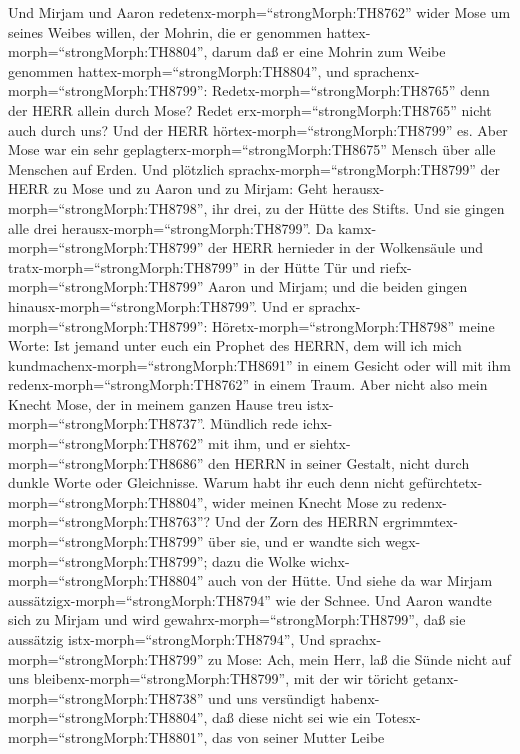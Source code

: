  Und Mirjam und Aaron redetenx-morph=``strongMorph:TH8762''
wider Mose um seines Weibes willen, der Mohrin, die er genommen
hattex-morph=``strongMorph:TH8804'', darum daß er eine Mohrin zum Weibe
genommen hattex-morph=``strongMorph:TH8804'',  und
sprachenx-morph=``strongMorph:TH8799'':
Redetx-morph=``strongMorph:TH8765'' denn der HERR allein durch Mose?
Redet erx-morph=``strongMorph:TH8765'' nicht auch durch uns? Und der
HERR hörtex-morph=``strongMorph:TH8799'' es.  Aber Mose war
ein sehr geplagterx-morph=``strongMorph:TH8675'' Mensch über alle
Menschen auf Erden.  Und plötzlich
sprachx-morph=``strongMorph:TH8799'' der HERR zu Mose und zu Aaron und
zu Mirjam: Geht herausx-morph=``strongMorph:TH8798'', ihr drei, zu der
Hütte des Stifts. Und sie gingen alle drei
herausx-morph=``strongMorph:TH8799''.  Da
kamx-morph=``strongMorph:TH8799'' der HERR hernieder in der Wolkensäule
und tratx-morph=``strongMorph:TH8799'' in der Hütte Tür und
riefx-morph=``strongMorph:TH8799'' Aaron und Mirjam; und die beiden
gingen hinausx-morph=``strongMorph:TH8799''.  Und er
sprachx-morph=``strongMorph:TH8799'':
Höretx-morph=``strongMorph:TH8798'' meine Worte: Ist jemand unter euch
ein Prophet des HERRN, dem will ich mich
kundmachenx-morph=``strongMorph:TH8691'' in einem Gesicht oder will mit
ihm redenx-morph=``strongMorph:TH8762'' in einem Traum. 
Aber nicht also mein Knecht Mose, der in meinem ganzen Hause treu
istx-morph=``strongMorph:TH8737''.  Mündlich rede
ichx-morph=``strongMorph:TH8762'' mit ihm, und er
siehtx-morph=``strongMorph:TH8686'' den HERRN in seiner Gestalt, nicht
durch dunkle Worte oder Gleichnisse. Warum habt ihr euch denn nicht
gefürchtetx-morph=``strongMorph:TH8804'', wider meinen Knecht Mose zu
redenx-morph=``strongMorph:TH8763''?  Und der Zorn des HERRN
ergrimmtex-morph=``strongMorph:TH8799'' über sie, und er wandte sich
wegx-morph=``strongMorph:TH8799'';  dazu die Wolke
wichx-morph=``strongMorph:TH8804'' auch von der Hütte. Und siehe da war
Mirjam aussätzigx-morph=``strongMorph:TH8794'' wie der Schnee. Und Aaron
wandte sich zu Mirjam und wird gewahrx-morph=``strongMorph:TH8799'', daß
sie aussätzig istx-morph=``strongMorph:TH8794'',  Und
sprachx-morph=``strongMorph:TH8799'' zu Mose: Ach, mein Herr, laß die
Sünde nicht auf uns bleibenx-morph=``strongMorph:TH8799'', mit der wir
töricht getanx-morph=``strongMorph:TH8738'' und uns versündigt
habenx-morph=``strongMorph:TH8804'',  daß diese nicht sei
wie ein Totesx-morph=``strongMorph:TH8801'', das von seiner Mutter Leibe
